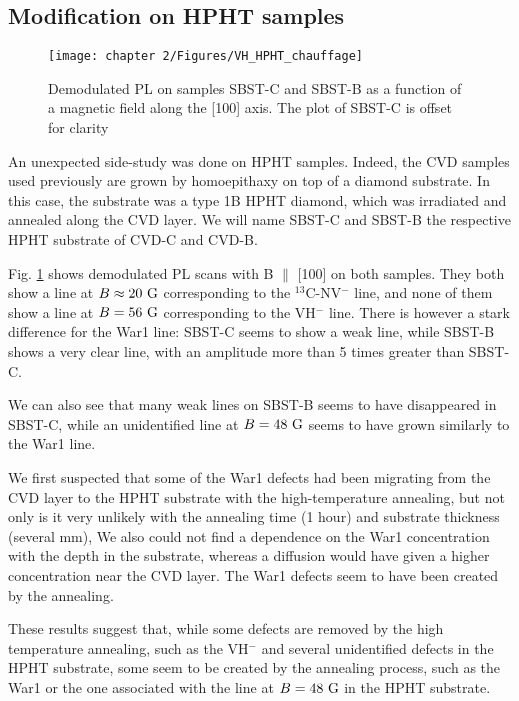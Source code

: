 \documentclass[a4paper, 11pt]{report}
\begin{document}
\subsection{Modification on HPHT samples}

\begin{figure}[h]
\centering
\texttt{[image: chapter 2/Figures/VH\_HPHT\_chauffage]}
\caption{Demodulated PL on samples SBST-C and SBST-B as a function of a magnetic field along the [100] axis. The plot of SBST-C is offset for clarity}
\label{chauffage HPHT}
\end{figure}

An unexpected side-study was done on HPHT samples. Indeed, the CVD samples used previously are grown by homoepithaxy on top of a diamond substrate. In this case, the substrate was a type 1B HPHT diamond, which was irradiated and annealed along the CVD layer. We will name SBST-C and SBST-B the respective HPHT substrate of CVD-C and CVD-B.

Fig. \ref{chauffage HPHT} shows demodulated PL scans with B $\parallel$ [100] on both samples. They both show a line at $B \approx 20\ \rm G$ corresponding to the $^{13}$C-NV$^-$ line, and none of them show a line at $B = 56\ \rm G$ corresponding to the VH$^-$ line. There is however a stark difference for the War1 line: SBST-C seems to show a weak line, while SBST-B shows a very clear line, with an amplitude more than 5 times greater than SBST-C. 

We can also see that many weak lines on SBST-B seems to have disappeared in SBST-C, while an unidentified line at $B = 48\ \rm G$ seems to have grown similarly to the War1 line.

We first suspected that some of the War1 defects had been migrating from the CVD layer to the HPHT substrate with the high-temperature annealing, but not only is it very unlikely with the annealing time (1 hour) and substrate thickness (several mm), We also could not find a dependence on the War1 concentration with the depth in the substrate, whereas a diffusion would have given a higher concentration near the CVD layer. The War1 defects seem to have been created by the annealing.

These results suggest that, while some defects are removed by the high temperature annealing, such as the VH$^-$ and several unidentified defects in the HPHT substrate, some seem to be created by the annealing process, such as the War1 or the one associated with the line at $B = 48\ \rm G$ in the HPHT substrate.
\end{document}
